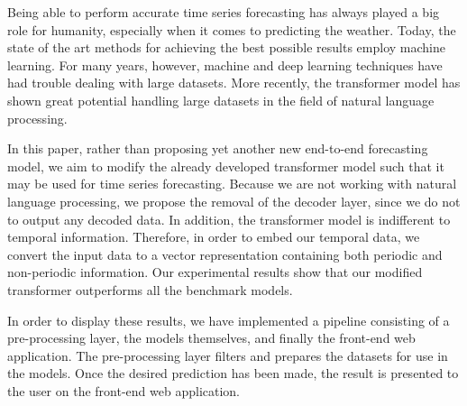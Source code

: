 Being able to perform accurate time series forecasting has always played a big role for humanity, especially when it comes to predicting the weather. 
Today, the state of the art methods for achieving the best possible results employ machine learning. 
For many years, however, machine and deep learning techniques have had trouble dealing with large datasets. 
More recently, the transformer model has shown great potential handling large datasets in the field of natural language processing.

In this paper, rather than proposing yet another new end-to-end forecasting model, we aim to modify the already developed transformer model such that it may be used for time series forecasting. 
Because we are not working with natural language processing, we propose the removal of the decoder layer, since we do not to output any decoded data. 
In addition, the transformer model is indifferent to temporal information. 
Therefore, in order to embed our temporal data, we convert the input data to a vector representation containing both periodic and non-periodic information.
Our experimental results show that our modified transformer outperforms all the benchmark models.

In order to display these results, we have implemented a pipeline consisting of a pre-processing layer, the models themselves, and finally the front-end web application.
The pre-processing layer filters and prepares the datasets for use in the models.
Once the desired prediction has been made, the result is presented to the user on the front-end web application.